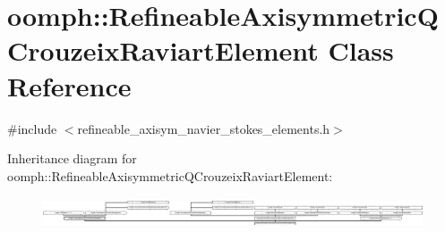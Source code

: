 \hypertarget{classoomph_1_1RefineableAxisymmetricQCrouzeixRaviartElement}{}\section{oomph\+:\+:Refineable\+Axisymmetric\+Q\+Crouzeix\+Raviart\+Element Class Reference}
\label{classoomph_1_1RefineableAxisymmetricQCrouzeixRaviartElement}


{\ttfamily \#include $<$refineable\+\_\+axisym\+\_\+navier\+\_\+stokes\+\_\+elements.\+h$>$}

Inheritance diagram for oomph\+:\+:Refineable\+Axisymmetric\+Q\+Crouzeix\+Raviart\+Element\+:\begin{figure}[H]
\begin{center}
\leavevmode
\includegraphics[height=0.912349cm]{classoomph_1_1RefineableAxisymmetricQCrouzeixRaviartElement}
\end{center}
\end{figure}

